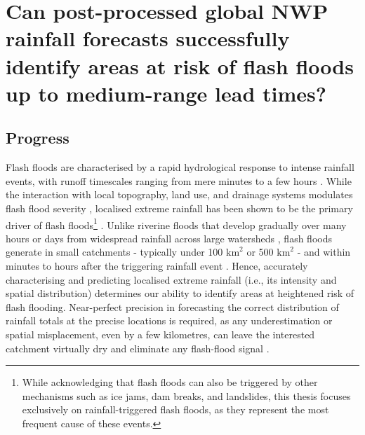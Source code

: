 \section{Can post-processed global NWP rainfall forecasts successfully identify areas at risk of flash floods up to medium-range lead times?}

\subsection{Progress}

Flash floods are characterised by a rapid hydrological response to intense rainfall events, with runoff timescales ranging from mere minutes to a few hours \citep{Davis_2001}. While the interaction with local topography, land use, and drainage systems modulates flash flood severity \citep{Marchi_2010, Villacca_2025}, localised extreme rainfall has been shown to be the primary driver of flash floods\footnote{While acknowledging that flash floods can also be triggered by other mechanisms such as ice jams, dam breaks, and landslides, this thesis focuses exclusively on rainfall-triggered flash floods, as they represent the most frequent cause of these events.} \citep{Schumacher_2017, Borga_2014, Archer_2018, Meyer_2022}. Unlike riverine floods that develop gradually over many hours or days from widespread rainfall across large watersheds \citep{Wohl_2022}, flash floods generate in small catchments - typically under 100 $\text{km}^2$ or 500 $\text{km}^2$ - and within minutes to hours after the triggering rainfall event \citep{Braud_2014, Bloschl_2015}. Hence, accurately characterising and predicting localised extreme rainfall (i.e., its intensity and spatial distribution) determines our ability to identify areas at heightened risk of flash flooding. Near-perfect precision in forecasting the correct distribution of rainfall totals at the precise locations is required, as any underestimation or spatial misplacement, even by a few kilometres, can leave the interested catchment virtually dry and eliminate any flash-flood signal \citep{Nicotina_2008, Douinot_2016, Clark_2016, Wang_2022}.

